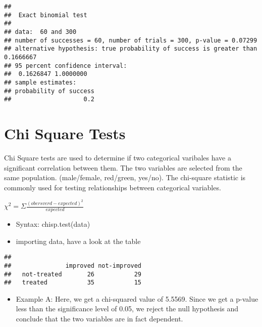 \documentclass[]{article}
\newenvironment{Shaded}{\begin{snugshade}}{\end{snugshade}}
\newcommand{\KeywordTok}[1]{\textcolor[rgb]{0.13,0.29,0.53}{\textbf{#1}}}
\newcommand{\NormalTok}[1]{#1}
\newcommand{\OperatorTok}[1]{\textcolor[rgb]{0.81,0.36,0.00}{\textbf{#1}}}
\newcommand{\StringTok}[1]{\textcolor[rgb]{0.31,0.60,0.02}{#1}}
\providecommand{\tightlist}{%
  \setlength{\itemsep}{0pt}\setlength{\parskip}{0pt}}
\begin{document}
\begin{verbatim}
## 
##  Exact binomial test
## 
## data:  60 and 300
## number of successes = 60, number of trials = 300, p-value = 0.07299
## alternative hypothesis: true probability of success is greater than 0.1666667
## 95 percent confidence interval:
##  0.1626847 1.0000000
## sample estimates:
## probability of success 
##                    0.2
\end{verbatim}

\hypertarget{chi-square-tests}{%
\section{Chi Square Tests}\label{chi-square-tests}}

Chi Square tests are used to determine if two categorical varibales have
a significant correlation between them. The two variables are selected
from the same population. (male/female, red/green, yes/no). The
chi-square statistic is commonly used for testing relationships between
categorical variables.

\(\chi^2=\Sigma \frac {(obersverd - expected)^2}{expected}\)

\begin{itemize}
\item
  Syntax: chisp.test(data)
\item
  importing data, have a look at the table
\end{itemize}

\begin{Shaded}
\end{Shaded}

\begin{verbatim}
##              
##               improved not-improved
##   not-treated       26           29
##   treated           35           15
\end{verbatim}

\begin{itemize}
\tightlist
\item
  Example A: Here, we get a chi-squared value of 5.5569. Since we get a
  p-value less than the significance level of 0.05, we reject the null
  hypothesis and conclude that the two variables are in fact dependent.
\end{itemize}
\end{document}
